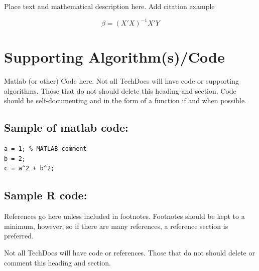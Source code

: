 Place text and mathematical description here. Add citation example \cite{Figueredo:2009dg}



\begin{equation}
    \beta=(X'X)^{-1}X'Y
\end{equation}

\section*{Supporting Algorithm(s)/Code}

Matlab (or other) Code here.  Not all TechDocs will have code or supporting algorithms. Those that do not should delete this heading and section.  Code should be self-documenting and in the form of a function if and when possible.


\subsection*{Sample of matlab code:} %
\begin{lstlisting} 
a = 1; % MATLAB comment 
b = 2; 
c = a^2 + b^2; 
\end{lstlisting}


\subsection*{Sample R code:}





References go here unless included in footnotes.  Footnotes should be kept to a minimum, however, so if there are many references, a reference section is preferred.  


Not all TechDocs will have code or references. Those that do not should delete or comment this heading and section.

